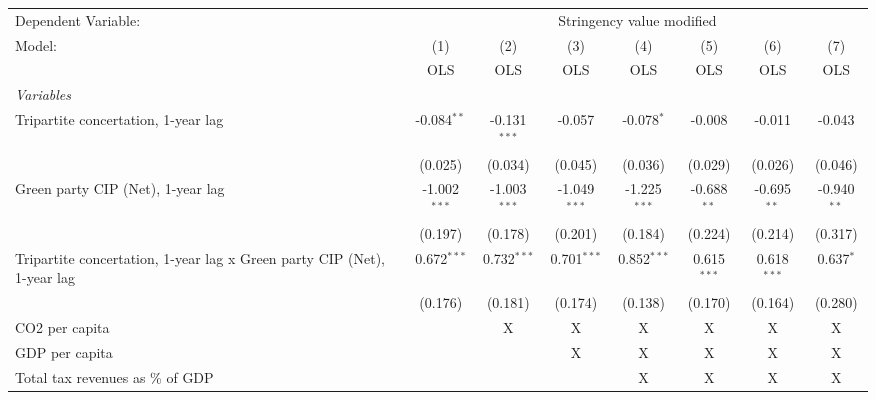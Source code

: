 
\begingroup
\centering
\begin{tabular}{lccccccc}
   \toprule
   Dependent Variable: & \multicolumn{7}{c}{Stringency value modified}\\
   Model:                                                                  & (1)            & (2)            & (3)            & (4)            & (5)           & (6)           & (7)\\  
                                                                           &  OLS           & OLS            & OLS            & OLS            & OLS           & OLS           & OLS\\  
   \midrule
   \emph{Variables}\\
   Tripartite concertation, 1-year lag                                     & -0.084$^{**}$  & -0.131$^{***}$ & -0.057         & -0.078$^{*}$   & -0.008        & -0.011        & -0.043\\   
                                                                           & (0.025)        & (0.034)        & (0.045)        & (0.036)        & (0.029)       & (0.026)       & (0.046)\\   
   Green party CIP (Net), 1-year lag                                       & -1.002$^{***}$ & -1.003$^{***}$ & -1.049$^{***}$ & -1.225$^{***}$ & -0.688$^{**}$ & -0.695$^{**}$ & -0.940$^{**}$\\   
                                                                           & (0.197)        & (0.178)        & (0.201)        & (0.184)        & (0.224)       & (0.214)       & (0.317)\\   
   Tripartite concertation, 1-year lag x Green party CIP (Net), 1-year lag & 0.672$^{***}$  & 0.732$^{***}$  & 0.701$^{***}$  & 0.852$^{***}$  & 0.615$^{***}$ & 0.618$^{***}$ & 0.637$^{*}$\\   
                                                                           & (0.176)        & (0.181)        & (0.174)        & (0.138)        & (0.170)       & (0.164)       & (0.280)\\   
   CO2 per capita                                                          &                & X              & X              & X              & X             & X             & X\\  
   GDP per capita                                                          &                &                & X              & X              & X             & X             & X\\  
   Total tax revenues as \% of GDP                                         &                &                &                & X              & X             & X             & X\\  

\end{tabular}
